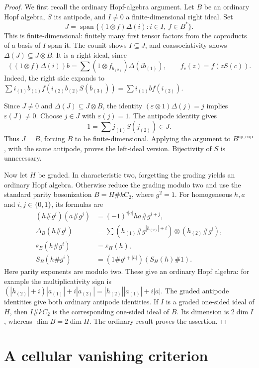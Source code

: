 \documentclass[11pt]{article}
\begin{document}
\begin{proof}
We first recall the ordinary Hopf-algebra argument. Let \(B\) be an ordinary Hopf algebra, \(S\) its antipode, and \(I\ne0\) a finite-dimensional right ideal. Set
\[
J=\operatorname{span}\{(1\otimes f)\Delta(i):i\in I,\ f\in B^*\}.
\]
This is finite-dimensional: finitely many first tensor factors from the coproducts of a basis of \(I\) span it. The counit shows \(I\subseteq J\), and coassociativity shows \(\Delta(J)\subseteq J\otimes B\). It is a right ideal, since
\[
((1\otimes f)\Delta(i))b
 =\sum (1\otimes f_{b_{(2)}})\Delta(ib_{(1)}),
 \qquad f_c(z)=f(zS(c)).
\]
Indeed, the right side expands to
\(\sum i_{(1)}b_{(1)}f(i_{(2)}b_{(2)}S(b_{(3)}))
=\sum i_{(1)}b f(i_{(2)})\).

Since \(J\ne0\) and \(\Delta(J)\subseteq J\otimes B\), the identity
\((\varepsilon\otimes1)\Delta(j)=j\) implies \(\varepsilon(J)\ne0\).
Choose \(j\in J\) with \(\varepsilon(j)=1\). The antipode identity gives
\[
1=\sum j_{(1)}S(j_{(2)})\in J.
\]
Thus \(J=B\), forcing \(B\) to be finite-dimensional. Applying the argument to \(B^{\mathrm{op},\mathrm{cop}}\), with the same antipode, proves the left-ideal version. Bijectivity of \(S\) is unnecessary.

Now let \(H\) be graded. In characteristic two, forgetting the grading yields an ordinary Hopf algebra. Otherwise reduce the grading modulo two and use the standard parity bosonization \(B=H\# kC_2\), where \(g^2=1\). For homogeneous \(h,a\) and \(i,j\in\{0,1\}\), its formulas are
\begin{align*}
(h\#g^i)(a\#g^j)&=(-1)^{i|a|}ha\#g^{i+j},\\
\Delta_B(h\#g^i)&=\sum
(h_{(1)}\#g^{|h_{(2)}|+i})\otimes(h_{(2)}\#g^i),\\
\varepsilon_B(h\#g^i)&=\varepsilon_H(h),\\
S_B(h\#g^i)&=(1\#g^{i+|h|})(S_H(h)\#1).
\end{align*}
Here parity exponents are modulo two. These give an ordinary Hopf algebra: for example the multiplicativity sign is
\((|h_{(2)}|+i)|a_{(1)}|+i|a_{(2)}|
=|h_{(2)}||a_{(1)}|+i|a|\).
The graded antipode identities give both ordinary antipode identities. If \(I\) is a graded one-sided ideal of \(H\), then \(I\#kC_2\) is the corresponding one-sided ideal of \(B\). Its dimension is \(2\dim I\), whereas \(\dim B=2\dim H\). The ordinary result proves the assertion.
\end{proof}

\section{A cellular vanishing criterion}
\end{document}
